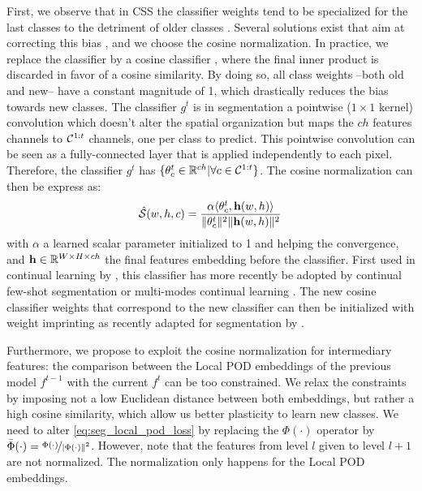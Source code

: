 First, we observe that in \ac{CSS} the classifier weights tend to be specialized for the last classes to
the detriment of older classes \citep{hou2019ucir}. Several solutions exist that aim at correcting
this bias
\citep{wu2019bias_correction,belouadah2019il2m,zhao2020weightalignement,luo2018cosine_classifier}, and
we choose the cosine normalization. In practice, we replace the classifier by a cosine classifier
\citep{luo2018cosine_classifier}, where the final inner product is discarded in favor of a cosine
similarity. By doing so, all class weights --both old and new-- have a constant magnitude of 1,
which drastically reduces the bias towards new classes. The classifier $g^t$ is in segmentation a
pointwise ($1\times1$ kernel) convolution which doesn't alter the spatial organization but maps the
$ch$ features channels to $\mathcal{C}^{1:t}$ channels, one per class to predict. This pointwise
convolution can be seen as a fully-connected layer that is applied independently to each pixel.
Therefore, the classifier $g^t$ has $\{\theta_c^t \in \mathbb{R}^{ch} | \forall c \in \mathcal{C}^{1:t}\}$.
The cosine normalization can then be express as:
%
\begin{equation}
    \hat{\mathcal{S}}(w, h, c) = \frac{\alpha \langle \theta^t_c, \mathbf{h}(w, h) \rangle}{\Vert \theta^t_c \Vert^2 \Vert \mathbf{h}(w, h) \Vert^2}\,
    \label{eq:seg_cosine_classifier}
\end{equation}
%
\noindent with $\alpha$ a learned scalar parameter initialized to 1 and helping the convergence, and $\mathbf{h} \in
    \mathbb{R}^{W \times H \times ch}$ the final features embedding before the classifier. First
used in continual learning by \cite{hou2019ucir}, this classifier has more recently be adopted
by continual few-shot segmentation \citep{cermelli2020fewshotcontinualsegm} or multi-modes
continual learning \citep{douillard2020podnet}. The new cosine classifier weights that
correspond to the new classifier can then be initialized with weight imprinting
\citep{qi2018imprintedweights} as recently adapted for segmentation by
\cite{cermelli2020fewshotcontinualsegm}.

Furthermore, we propose to exploit the cosine normalization for intermediary features: the
comparison between the Local POD embeddings of the previous model $f^{t-1}$ with the current $f^t$
can be too constrained. We relax the constraints by imposing not a low Euclidean distance between
both embeddings, but rather a high cosine similarity, which allow us better plasticity to learn new
classes. We need to alter \autoref{eq:seg_local_pod_loss} by replacing the $\Phi(\cdot)$ operator by
$\bar{\Phi}(\cdot) = \nicefrac{\Phi(\cdot)}{\vert\Phi(\cdot)\Vert^2}$. However, note that the
features from level $l$ given to level $l+1$ are not normalized. The normalization only happens for
the Local POD embeddings.


